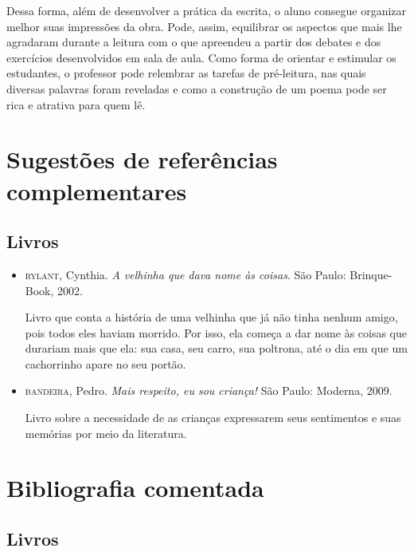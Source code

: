 \documentclass[11pt]{extarticle}
\begin{document}
Dessa forma, além de desenvolver a prática da escrita, o aluno consegue organizar melhor suas impressões da obra. Pode, assim, equilibrar os aspectos que mais lhe agradaram durante a leitura com o que apreendeu a partir dos debates e dos exercícios desenvolvidos em sala de aula. Como forma de orientar e estimular os estudantes, o professor pode relembrar as tarefas de pré-leitura, nas quais diversas palavras foram reveladas e como a construção de um poema pode ser rica e atrativa para quem lê.

\section{Sugestões de referências complementares}

\subsection{Livros} 

\begin{itemize}
\item \textsc{rylant}, Cynthia. \textit{A velhinha que dava nome às coisas}. São Paulo: Brinque-Book, 2002.

Livro que conta a história de uma velhinha que já não tinha nenhum amigo, pois todos eles haviam morrido. Por isso, ela começa a dar nome às coisas que durariam mais que ela: sua casa, seu carro, sua poltrona, até o dia em que um cachorrinho apare no seu portão.

\item \textsc{bandeira}, Pedro. \textit{Mais respeito, eu sou criança!} São Paulo: Moderna, 2009.

Livro sobre a necessidade de as crianças expressarem seus sentimentos e suas memórias por meio da literatura.

\end{itemize}

\section{Bibliografia comentada}
\subsection{Livros}
\end{document}
